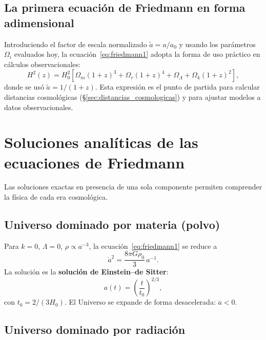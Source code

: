 \subsection{La primera ecuación de Friedmann en forma adimensional}

Introduciendo el factor de escala normalizado $\tilde a=a/a_0$ y usando los parámetros $\Omega_i$ evaluados hoy, la ecuación~\eqref{eq:friedmann1} adopta la forma de uso práctico en cálculos observacionales:
\begin{equation}
  H^2(z) = H_0^2\!\left[\Omega_m(1+z)^3 + \Omega_r(1+z)^4 + \Omega_\Lambda + \Omega_k(1+z)^2\right],
  \label{eq:friedmann_z}
\end{equation}
donde se usó $\tilde a = 1/(1+z)$. Esta expresión es el punto de partida para calcular distancias cosmológicas (§\ref{sec:distancias_cosmologicas}) y para ajustar modelos a datos observacionales.

\section{Soluciones analíticas de las ecuaciones de Friedmann}
\label{sec:soluciones_friedmann}

Las soluciones exactas en presencia de una sola componente permiten comprender la física de cada era cosmológica.

\subsection{Universo dominado por materia (polvo)}

Para $k=0$, $\Lambda=0$, $\rho\propto a^{-3}$, la ecuación~\eqref{eq:friedmann1} se reduce a
\begin{equation}
  \dot a^2 = \frac{8\pi G\rho_0}{3}\,a^{-1}.
\end{equation}
La solución es la \textbf{solución de Einstein--de Sitter}:
\begin{equation}
  \boxed{a(t) = \left(\frac{t}{t_0}\right)^{2/3},}
  \label{eq:eds}
\end{equation}
con $t_0=2/(3H_0)$. El Universo se expande de forma desacelerada: $\ddot a<0$.

\subsection{Universo dominado por radiación}

